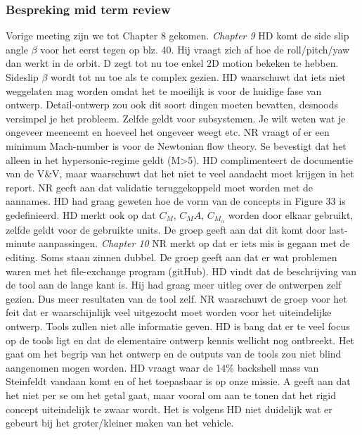 \subsubsection{Bespreking mid term review}
Vorige meeting zijn we tot Chapter 8 gekomen.
\newline\newline
\textit{Chapter 9}\newline
HD komt de side slip angle $\beta$ voor het eerst tegen op blz. 40. Hij vraagt zich af hoe de roll/pitch/yaw dan werkt in de orbit. D zegt tot nu toe enkel 2D motion bekeken te hebben. Sideslip $\beta$ wordt tot nu toe als te complex gezien. HD waarschuwt dat iets niet weggelaten mag worden omdat het te moeilijk is voor de huidige fase van ontwerp. Detail-ontwerp zou ook dit soort dingen moeten bevatten, desnoods versimpel je het probleem. Zelfde geldt voor subsystemen. Je wilt weten wat je ongeveer meeneemt en hoeveel het ongeveer weegt etc.
\newline
NR vraagt of er een minimum Mach-number is voor de Newtonian flow theory. Se bevestigt dat het alleen in het hypersonic-regime geldt (M>5). HD complimenteert de documentie van de V\&V, maar waarschuwt dat het niet te veel aandacht moet krijgen in het report. NR geeft aan dat validatie teruggekoppeld moet worden met de aannames. HD had graag geweten hoe de vorm van de concepts in Figure 33 is gedefinieerd.
\newline
HD merkt ook op dat $C_M$, $C_MA$, $C_{M_\alpha}$ worden door elkaar gebruikt, zelfde geldt voor de gebruikte units. De groep geeft aan dat dit komt door last-minute aanpassingen.
\newline\newline
\textit{Chapter 10}\newline
NR merkt op dat er iets mis is gegaan met de editing. Soms staan zinnen dubbel. De groep geeft aan dat er wat problemen waren met het file-exchange program (gitHub). HD vindt dat de beschrijving van de tool aan de lange kant is. Hij had graag meer uitleg over de ontwerpen zelf gezien. Dus meer resultaten van de tool zelf. NR waarschuwt de groep voor het feit dat er waarschijnlijk veel uitgezocht moet worden voor het uiteindelijke ontwerp. Tools zullen niet alle informatie geven. HD is bang dat er te veel focus op de tools ligt en dat de elementaire ontwerp kennis wellicht nog ontbreekt. Het gaat om het begrip van het ontwerp en de outputs van de tools zou niet blind aangenomen mogen worden.
\newline
HD vraagt waar de 14\% backshell mass van Steinfeldt vandaan komt en of het toepasbaar is op onze missie. A geeft aan dat het niet per se om het getal gaat, maar vooral om aan te tonen dat het rigid concept uiteindelijk te zwaar wordt. Het is volgens HD niet duidelijk wat er gebeurt bij het groter/kleiner maken van het vehicle.

